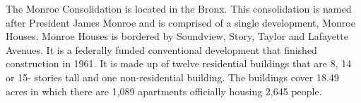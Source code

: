     

  

The Monroe Consolidation is located in the Bronx. This consolidation is named after President James Monroe and is comprised of a single development, Monroe Houses. Monroe Houses is bordered by Soundview, Story, Taylor and Lafayette Avenues. It is a federally funded conventional development that finished construction in 1961. It is made up of twelve residential buildings that are 8, 14 or 15- stories tall and one non-residential building. The buildings cover 18.49 acres in which there are 1,089 apartments officially housing 2,645 people.   